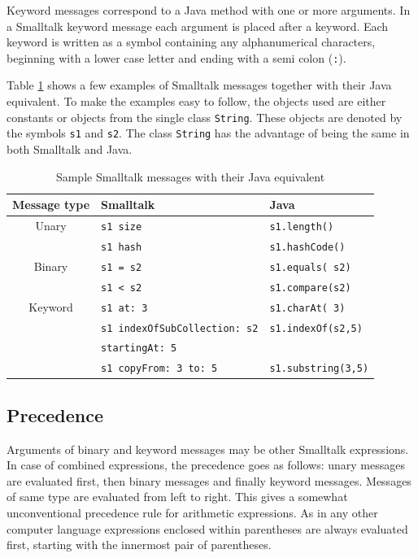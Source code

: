 \documentclass[twoside]{book}
\begin{document}
Keyword messages correspond to a Java method with one or more
arguments. In a Smalltalk keyword message each argument is placed
after a keyword. Each keyword is written as a symbol containing
any alphanumerical characters, beginning with a lower case letter
and ending with a semi colon ({\tt :}).

Table \ref{tb:stMessages} shows a few examples of Smalltalk
messages together with their Java equivalent. To make the examples
easy to follow, the objects used are either constants or objects
from the single class {\tt String}. These objects are denoted by
the symbols {\tt s1} and {\tt s2}. The class {\tt String} has the
advantage of being the same in both Smalltalk and Java.
\begin{table}[h]
  \centering
  \caption{Sample Smalltalk messages with their Java equivalent}\label{tb:stMessages}
\vspace{1 ex}
  \begin{tabular}{|c|l|l|} \hline
    Message type & Smalltalk & Java \\ \hline
    Unary & {\tt s1 size} & {\tt s1.length()} \\
     & {\tt s1 hash} & {\tt s1.hashCode()} \\ \hline
    Binary & {\tt s1 = s2} & {\tt s1.equals( s2)} \\
     & {\tt s1 < s2} & {\tt s1.compare(s2)} \\ \hline
    Keyword & {\tt s1 at: 3} & {\tt s1.charAt( 3)} \\
     & {\tt s1 indexOfSubCollection: s2} & {\tt s1.indexOf(s2,5)} \\
     & \hfil {\tt  startingAt: 5} &  \\
     & {\tt s1 copyFrom: 3 to: 5} & {\tt s1.substring(3,5)} \\ \hline
  \end{tabular}
\end{table}

\subsection{Precedence}
Arguments of binary and keyword messages may be other Smalltalk
expressions. In case of combined expressions, the precedence goes
as follows: unary messages are evaluated first, then binary
messages and finally keyword messages. Messages of same type are
evaluated from left to right. This gives a somewhat unconventional
precedence rule for arithmetic expressions. As in any other
computer language expressions enclosed within parentheses are
always evaluated first, starting with the innermost pair of
parentheses.
\end{document}

